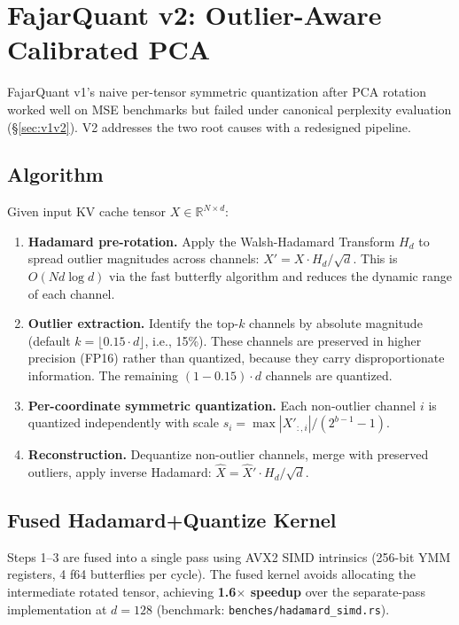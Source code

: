 \documentclass[10pt,twocolumn]{article}
\begin{document}
\section{FajarQuant v2: Outlier-Aware Calibrated PCA}
\label{sec:fqv2}

FajarQuant v1's naive per-tensor symmetric quantization after PCA
rotation worked well on MSE benchmarks but failed under canonical
perplexity evaluation (\S\ref{sec:v1v2}). V2 addresses the two root
causes with a redesigned pipeline.

\subsection{Algorithm}

Given input KV cache tensor $X \in \mathbb{R}^{N \times d}$:

\begin{enumerate}[nosep]
\item \textbf{Hadamard pre-rotation.} Apply the Walsh-Hadamard
      Transform $H_d$ to spread outlier magnitudes across channels:
      $X' = X \cdot H_d / \sqrt{d}$. This is $O(Nd\log d)$ via the
      fast butterfly algorithm and reduces the dynamic range of each
      channel.
\item \textbf{Outlier extraction.} Identify the top-$k$ channels by
      absolute magnitude (default $k = \lfloor 0.15 \cdot d \rfloor$,
      i.e., 15\%). These channels are preserved in higher precision
      (FP16) rather than quantized, because they carry disproportionate
      information. The remaining $(1{-}0.15) \cdot d$ channels are
      quantized.
\item \textbf{Per-coordinate symmetric quantization.} Each non-outlier
      channel $i$ is quantized independently with scale
      $s_i = \max|X'_{:,i}| / (2^{b-1} - 1)$.
\item \textbf{Reconstruction.} Dequantize non-outlier channels, merge
      with preserved outliers, apply inverse Hadamard:
      $\hat{X} = \hat{X}' \cdot H_d / \sqrt{d}$.
\end{enumerate}

\subsection{Fused Hadamard+Quantize Kernel}

Steps 1--3 are fused into a single pass using AVX2 SIMD intrinsics
(256-bit YMM registers, 4 f64 butterflies per cycle). The fused
kernel avoids allocating the intermediate rotated tensor, achieving
\textbf{1.6$\times$ speedup} over the separate-pass implementation
at $d{=}128$ (benchmark: \texttt{benches/hadamard\_simd.rs}).
\end{document}
